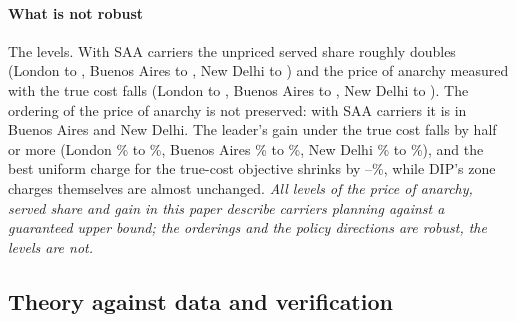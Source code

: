 \documentclass[preprint,11pt]{elsarticle}
\theoremstyle{definition}
\theoremstyle{remark}
\begin{document}
\paragraph{What is not robust} The levels. With SAA carriers the unpriced served share roughly doubles (London \CritPbServedLondon{} to \CritSaaServedLondon, Buenos Aires \CritPbServedBuenosAires{} to \CritSaaServedBuenosAires, New Delhi \CritPbServedNewDelhi{} to \CritSaaServedNewDelhi) and the price of anarchy measured with the true cost falls (London \CritPbPoaTrueLondon{} to \CritSaaPoaTrueLondon, Buenos Aires \CritPbPoaTrueBuenosAires{} to \CritSaaPoaTrueBuenosAires, New Delhi \CritPbPoaTrueNewDelhi{} to \CritSaaPoaTrueNewDelhi). The ordering of the price of anarchy is not preserved: with SAA carriers it is \CritSaaBAND{} in Buenos Aires and New Delhi. The leader's gain under the true cost falls by half or more (London \CritPbDipTrueLondon\% to \CritSaaDipTrueLondon\%, Buenos Aires \CritPbDipTrueBuenosAires\% to \CritSaaDipTrueBuenosAires\%, New Delhi \CritPbDipTrueNewDelhi\% to \CritSaaDipTrueNewDelhi\%), and the best uniform charge for the true-cost objective shrinks by \CritChargeDropMin--\CritChargeDropMax\%, while DIP's zone charges themselves are almost unchanged. \emph{All levels of the price of anarchy, served share and gain in this paper describe carriers planning against a guaranteed upper bound; the orderings and the policy directions are robust, the levels are not.}

\subsection{Theory against data and verification}\label{sec:res-theory}\label{sec:res-verif}
\end{document}
